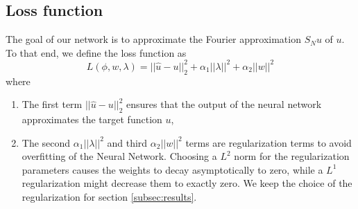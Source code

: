 \documentclass[AMS,STIX1COL]{WileyNJD-v2}
\begin{document}
\subsection{Loss function}
The goal of our network is to approximate the Fourier approximation $S_N u$ of $u$. To that end, we define the loss function as
 \begin{equation}\label{Eq:lossfunction}
     L(\phi, w, \lambda) = ||\hat{u} - u ||_2^2  + \alpha_1||\lambda||^2 + \alpha_2||w||^2
 \end{equation}
 where
 \begin{enumerate}
     \item The first term $ ||\hat{u} - u ||_2^2$ ensures that the output of the neural network approximates the target function $u$,
     \item The second $\alpha_1||\lambda||^2$  and third $\alpha_2||w||^2$ terms are regularization terms to avoid overfitting of the Neural Network. Choosing a $L^2$ norm for the regularization parameters causes the weights to decay asymptotically to zero, while a $L^1$ regularization might decrease them to exactly zero. We keep the choice of the regularization for section \ref{subsec:results}.
 \end{enumerate}
 
\end{document}
